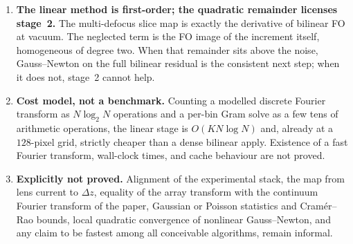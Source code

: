 \begin{enumerate}
\item
  \textbf{The linear method is first-order; the quadratic remainder
  licenses stage~2.}
  The multi-defocus slice map is exactly the derivative of bilinear FO
  at vacuum.
  The neglected term is the FO image of the increment itself,
  homogeneous of degree two.
  When that remainder sits above the noise, Gauss--Newton on the full
  bilinear residual is the consistent next step; when it does not,
  stage~2 cannot help.

\item
  \textbf{Cost model, not a benchmark.}
  Counting a modelled discrete Fourier transform as
  $N\log_2 N$ operations and a per-bin Gram solve as a few tens of
  arithmetic operations, the linear stage is $O(KN\log N)$ and,
  already at a $128$-pixel grid, strictly cheaper than a dense
  bilinear apply.
  Existence of a fast Fourier transform, wall-clock times, and cache
  behaviour are not proved.

\item
  \textbf{Explicitly not proved.}
  Alignment of the experimental stack, the map from lens current to
  $\Delta z$, equality of the array transform with the continuum
  Fourier transform of the paper, Gaussian or Poisson statistics and
  Cram\'er--Rao bounds, local quadratic convergence of nonlinear
  Gauss--Newton, and any claim to be fastest among all conceivable
  algorithms, remain informal.
\end{enumerate}

